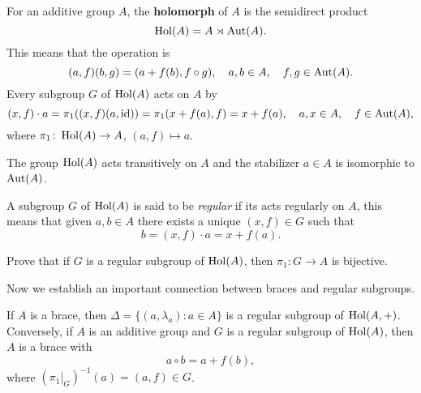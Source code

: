 \chapter{}


For an additive group $A$, the \textbf{holomorph} of $A$ is the semidirect product 
\[
	\operatorname{Hol}(A)=A\rtimes\operatorname{Aut}(A).
\]
This means that the operation is 
\[
	(a,f)(b,g)=(a+f(b),f\circ g),\quad
	a,b\in A,\quad
	f,g\in\operatorname{Aut}(A).
\]
Every subgroup $G$ of $\operatorname{Hol}(A)$ acts on $A$ by 
\[
	(x,f)\cdot a=\pi_1( (x,f)(a,\operatorname{id}) )=\pi_1(x+f(a),f)=x+f(a),\quad
	a,x\in A,\quad 
	f\in\operatorname{Aut}(A),
\]
where $\pi_1\colon \operatorname{Hol}(A)\to A$, $(a,f)\mapsto a$. 

\begin{exercise}
    The group $\operatorname{Hol}(A)$ acts transitively on $A$ 
	and the stabilizer $a\in A$ 
	is isomorphic to $\operatorname{Aut}(A)$. 
\end{exercise}

A subgroup $G$ of $\operatorname{Hol}(A)$ is said to be \emph{regular} 
if its acts regularly on $A$, this means that 
given $a,b\in A$ there exists a unique $(x,f)\in G$ such that
\[
	b=(x,f)\cdot a=x+f(a).
\]

\begin{exercise}
    \label{xca:bijective}
	Prove that 
	if $G$ is a regular subgroup of $\operatorname{Hol}(A)$, then $\pi_1\colon G\to A$ is
	bijective. 
\end{exercise}

Now we establish an important connection between braces and regular subgroups. 

\begin{theorem}
\label{thm:regular}
	If $A$ is a brace, then $\Delta=\{(a,\lambda_a):a\in A\}$ is a regular subgroup of 
	$\operatorname{Hol}(A,+)$. Conversely, if $A$ is an additive group and 
	$G$ is a regular subgroup of $\operatorname{Hol}(A)$, then $A$ is 
	a brace with 
	\[
		a\circ b=a+f(b),
	\]
	where $(\pi_1|_G)^{-1}(a)=(a,f)\in G$. 
\end{theorem}

